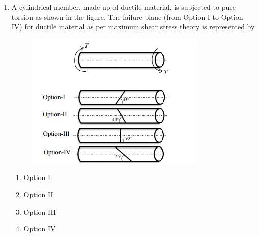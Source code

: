 \documentclass[a4paper,10pt]{article}
\begin{document}
\begin{enumerate}
    \item A cylindrical member, made up of ductile material, is subjected to pure torsion as shown in the figure. The failure plane (from Option-I to Option-IV) for ductile material as per maximum shear stress theory is represented by
    \begin{figure}[H] \centering \includegraphics[width=0.6\columnwidth]{q14_solid.png} \caption*{} \label{fig:q14_solid} \end{figure}
    \hfill{}
    \begin{enumerate}[label=\Alph*)]
        \item Option I
        \item Option II
        \item Option III
        \item Option IV
    \end{enumerate}


\end{enumerate}
\end{document}

